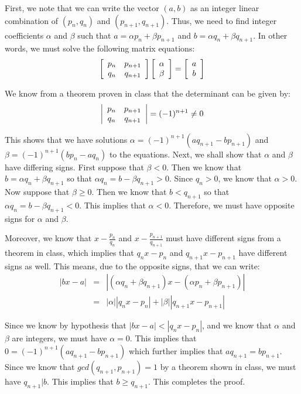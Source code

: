 \documentclass[psamsfonts]{amsart}
\newenvironment{sol}{{\bfseries Solution}}{\qedsymbol}
\theoremstyle{definition}
\theoremstyle{remark}
\numberwithin{equation}{section}
\begin{document}
\begin{sol}
First, we note that we can write the vector $(a,b)$ as an integer linear combination of $(p_n, q_n)$ and $(p_{n+1}, q_{n+1})$. Thus, we need to find integer coefficients $\alpha$ and $\beta$ such that $a = \alpha p_n + \beta p_{n+1}$ and $b = \alpha q_n + \beta q_{n+1}$. In other words, we must solve the following matrix equations:
\begin{equation}
\left[ \begin{array}{c c}
p_n & p_{n+1} \\
q_n & q_{n+1} 
\end{array} \right] \left[ \begin{array}{c}
\alpha \\
\beta \end{array} \right] = \left[ \begin{array}{c}
a \\
b \end{array} \right]
\end{equation}

We know from a theorem proven in class that the determinant can be given by:
\begin{equation}
\left| \begin{array}{c c}
p_n & p_{n+1} \\
q_n & q_{n+1} 
\end{array} \right|  = (-1)^{n+1} \neq 0
\end{equation}

This shows that we have solutions $\alpha = (-1)^{n+1} (a q_{n+1} - b p_{n+1})$ and $\beta = (-1)^{n+1} (b p_n - a q_n)$ to the equations. Next, we shall show that $\alpha$ and $\beta$ have differing signs. First suppose that $\beta < 0$. Then we know that $b = \alpha q_n + \beta q_{n+1}$ so that $\alpha q_n = b - \beta q_{n+1} > 0$. Since $q_n > 0$, we know that $\alpha > 0$. Now suppose that $\beta \geq 0$. Then we know that $b < q_{n+1}$ so that $\alpha q_n = b - \beta q_{n+1} < 0$. This implies that $\alpha <0$. Therefore, we must have opposite signs for $\alpha$ and $\beta$.

Moreover, we know that $x - \frac{p_n}{q_n}$ and $x - \frac{p_{n+1}}{q_{n+1}}$ must have different signs from a theorem in class, which implies that $q_n x - p_n$ and $q_{n+1} x - p_{n+1}$ have different signs as well. This means, due to the opposite signs, that we can write:
\begin{eqnarray}
|bx-a| &=& |(\alpha q_n + \beta q_{n+1})x - (\alpha p_n + \beta p_{n+1})| \\
&=& |\alpha| |q_n x - p_n | + |\beta| |q_{n+1} x - p_{n+1}|
\end{eqnarray}

Since we know by hypothesis that $|bx-a| < |q_n x - p_n|$, and we know that $\alpha$ and $\beta$ are integers, we must have $\alpha = 0$. This implies that $0 = (-1)^{n+1} (a q_{n+1} - b p_{n+1})$ which further implies that $a q_{n+1} = b p_{n+1}$. Since we know that $gcd(q_{n+1}, p_{n+1}) = 1$ by a theorem shown in class, we must have $q_{n+1} | b$. This implies that $b \geq q_{n+1}$. This completes the proof.
\end{sol}
\end{document}
